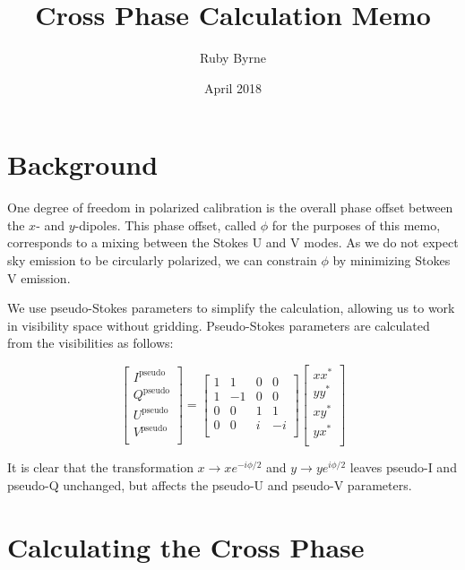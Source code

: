 \documentclass[a4paper,11pt]{article}
\title{Cross Phase Calculation Memo}
\author{Ruby Byrne}
\date{April 2018}
\begin{document}
\maketitle


\section{Background}

One degree of freedom in polarized calibration is the overall phase offset between the $x$- and $y$-dipoles. This phase offset, called $\phi$ for the purposes of this memo, corresponds to a mixing between the Stokes U and V modes. As we do not expect sky emission to be circularly polarized, we can constrain $\phi$ by minimizing Stokes V emission. 

We use pseudo-Stokes parameters to simplify the calculation, allowing us to work in visibility space without gridding. Pseudo-Stokes parameters are calculated from the visibilities as follows:

\begin{equation}
\begin{bmatrix}
	I^{\text{pseudo}} \\
	Q^{\text{pseudo}} \\
	U^{\text{pseudo}} \\
	V^{\text{pseudo}} \\
\end{bmatrix}
=
\begin{bmatrix}
	1 & 1 & 0 & 0 \\
	1 & -1 & 0 & 0 \\
	0 & 0 & 1 & 1 \\
	0 & 0 & i & -i \\
\end{bmatrix}
\begin{bmatrix}
	xx^* \\
	yy^* \\
	xy^* \\
	yx^* \\
\end{bmatrix}
\end{equation}

It is clear that the transformation $x \rightarrow x e^{-i \phi/2}$ and $y \rightarrow y e^{i \phi/2}$ leaves pseudo-I and pseudo-Q unchanged, but affects the pseudo-U and pseudo-V parameters.


\section{Calculating the Cross Phase}
\end{document}
